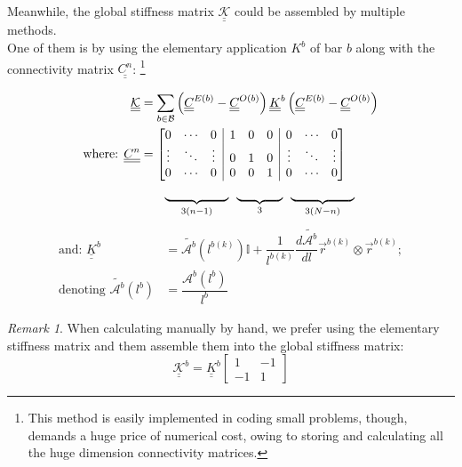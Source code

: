 \documentclass[a4paper,12pt]{article}
\numberwithin{equation}{section}
\theoremstyle{remark}
\newtheorem{rmk}{Remark}
\begin{document}
Meanwhile, the global stiffness matrix $\underline{\underline{\mathcal{K}}}$ could be assembled by multiple methods. \\ 
One of them is by using the elementary application $K^b$ of bar $b$ along with the connectivity matrix $\underline{\underline{C^n}}$: \footnote{This method is easily implemented in coding small problems, though, demands a huge price of numerical cost, owing to storing and calculating all the huge dimension connectivity matrices.} 

\begin{align}
  \underline{\underline{\mathcal{K}}} &= \sum_{b \in \mathcal{B}} \left( \underline{\underline{C}}^{E(b)} - \underline{\underline{C}}^{O(b)}\right) \underline{\underline{K}}^b \left( \underline{\underline{C}}^{E(b)} - \underline{\underline{C}}^{O(b)}\right) \\
  \text{where: }\underline{\underline{C^n}} & =
  \left[
  \begin{array}{@{}ccc|ccc|ccc@{}}
    0 & \cdots & 0 & 1 & 0 & 0 & 0 & \cdots & 0 \\
    \vdots & \ddots & \vdots & 0 & 1 & 0 & \vdots & \ddots & \vdots \\
    0 & \cdots & 0 & 0 & 0 & 1 & 0 & \cdots & 0
  \end{array}
  \right] \label{connectivityMatrix} \\
  &\qquad
  \begin{array}{@{}c@{\ }c@{\ }c@{}}
    \underbrace{\hspace{1.8cm}}_{3(n-1)} \ &
    \underbrace{\hspace{1.3cm}}_{3} \ &
    \underbrace{\hspace{1.8cm}}_{3(N-n)}  \\
  \end{array} \nonumber
\end{align}
    \begin{align}
    \text{and: } \underline{\underline{K}}^b &= \tilde{\mathcal{A}^b}(l^{b(k)}) \mathbb{I} + \dfrac{1}{l^{b(k)}} \dfrac{d\tilde{\mathcal{A}^b}}{dl} \vec{r}^{b(k)} \otimes \vec{r}^{b(k)};\\
    \text{denoting }\tilde{\mathcal{A}^b}\left(l^b\right) &= \dfrac{\mathcal{A}^b \left( l^b\right)}{l^b}
  \label{stifnessMatrix}
   \end{align}
\begin{rmk}\label{rmk:elementaryStiffness}
When calculating manually by hand, we prefer using the elementary stiffness matrix and them assemble them into the global stiffness matrix:
\begin{equation}
  \underline{\underline{\mathcal{K}}}^b = \underline{\underline{K}}^b 
  \begin{bmatrix}
    1 & -1 \\
    -1 & 1 
  \end{bmatrix} \label{elementaryStiffness}
\end{equation}
\end{rmk}
\end{document}
